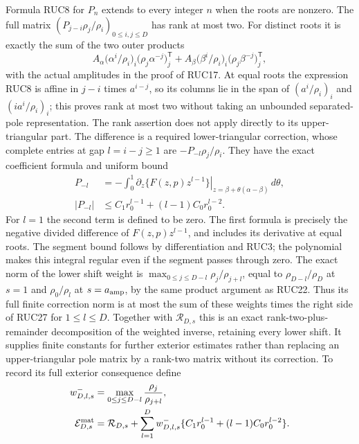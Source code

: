 \documentclass[11pt]{article}
\begin{document}
Formula RUC8 for $P_n$ extends to every integer $n$ when the roots
are nonzero.  The full matrix
$(P_{j-i}\rho_j/\rho_i)_{0\le i,j\le D}$ has rank at most two.
For distinct roots it is exactly the sum of the two outer products
\[
 A_\alpha\bigl(\alpha^i/\rho_i\bigr)_i
                  \bigl(\rho_j\alpha^{-j}\bigr)_j^{\mathsf T}
 +A_\beta\bigl(\beta^i/\rho_i\bigr)_i
                  \bigl(\rho_j\beta^{-j}\bigr)_j^{\mathsf T},
 \tag{RUC26}
\]
with the actual amplitudes in the proof of RUC17.
At equal roots the expression RUC8 is affine in $j-i$ times
$a^{i-j}$, so its columns lie in the span of
$(a^i/\rho_i)_i$ and $(ia^i/\rho_i)_i$; this proves rank at most
two without taking an unbounded separated-pole representation.
The rank assertion does not apply directly to its upper-triangular
part.  The difference is a required lower-triangular correction,
whose complete entries at gap $l=i-j\ge1$ are $-P_{-l}\rho_j/\rho_i$.
They have the exact coefficient formula and uniform bound
\[
 \begin{aligned}
 P_{-l}&=-\int_0^1
   \left.\partial_z\{F(z,p)z^{l-1}\}\right|_{
                  z=\beta+\theta(\alpha-\beta)}\,d\theta,\\
 |P_{-l}|&\le C_1r_0^{l-1}+(l-1)C_0r_0^{l-2}.
 \end{aligned}\tag{RUC27}
\]
For $l=1$ the second term is defined to be zero.
The first formula is precisely the negative divided difference
of $F(z,p)z^{l-1}$, and includes its derivative at equal roots.
The segment bound follows by differentiation and RUC3; the
polynomial makes this integral regular even if the segment passes
through zero.  The exact norm of the lower shift weight is
$\max_{0\le j\le D-l}\rho_j/\rho_{j+l}$, equal to
$\rho_{D-l}/\rho_D$ at $s=1$ and $\rho_0/\rho_l$ at
$s=a_{\rm amp}$, by the same product argument as RUC22.
Thus its full finite correction norm is at most the sum of
these weights times the right side of RUC27 for $1\le l\le D$.
Together with $\mathcal R_{D,s}$ this is an exact rank-two-plus-
remainder decomposition of the weighted inverse, retaining every
lower shift.  It supplies finite constants for further exterior
estimates rather than replacing an upper-triangular pole matrix
by a rank-two matrix without its correction.
To record its full exterior consequence define
\[
 \begin{aligned}
 w^-_{D,l,s}&=\max_{0\le j\le D-l}\frac{\rho_j}{\rho_{j+l}},\\
 \mathcal E_{D,s}^{\rm mat}
 &=\mathcal R_{D,s}+
   \sum_{l=1}^D w^-_{D,l,s}
        \{C_1r_0^{l-1}+(l-1)C_0r_0^{l-2}\}.
 \end{aligned}
\]
\end{document}
